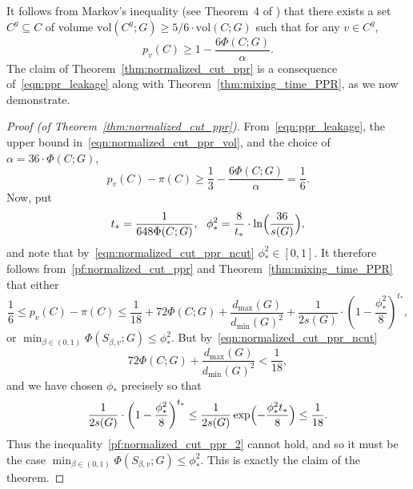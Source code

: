 \documentclass{article}
\newcommand{\vol}{\mathrm{vol}}
\newcommand{\1}{\mathbf{1}}
\theoremstyle{definition}
\theoremstyle{remark}
\begin{document}
It follows from Markov's inequality (see Theorem~4 of \cite{andersen2006}) that there exists a set $C^g \subseteq C$ of volume $\vol(C^g;G) \geq 5/6 \cdot \vol(C;G)$ such that for any $v \in C^g$,
\begin{equation}
\label{eqn:ppr_leakage}
p_v(C) \geq 1 - \frac{6\Phi(C;G)}{\alpha}.
\end{equation}
The claim of Theorem~\ref{thm:normalized_cut_ppr} is a consequence of~\eqref{eqn:ppr_leakage} along with Theorem~\ref{thm:mixing_time_PPR}, as we now demonstrate.
\begin{proof}[Proof (of Theorem~\ref{thm:normalized_cut_ppr})]
	From~\eqref{eqn:ppr_leakage}, the upper bound in~\eqref{eqn:normalized_cut_ppr_vol}, and the choice of $\alpha = 36 \cdot \Phi(C;G)$, 
	\begin{equation}
	\label{pf:normalized_cut_ppr}
	p_v(C) - \pi(C) \geq \frac{1}{3} - \frac{6 \Phi(C;G)}{\alpha} = \frac{1}{6}.
	\end{equation}
	Now, put 
	\begin{equation*}
	t_{\ast} = \frac{1}{648 \Phi(C;G)},~~\phi_{\ast}^2 = \frac{8}{t_{\ast}} \cdot \ln\Bigl(\frac{36}{s(G)}\Bigr),
	\end{equation*}
	and note that by~\eqref{eqn:normalized_cut_ppr_ncut} $\phi_{\ast}^2 \in [0,1]$. It therefore follows from~\eqref{pf:normalized_cut_ppr} and Theorem~\ref{thm:mixing_time_PPR} that either
	\begin{equation}
	\label{pf:normalized_cut_ppr_2}
	\frac{1}{6} \leq p_v(C) - \pi(C) \leq \frac{1}{18} + 72 \Phi(C;G) + \frac{d_{\max}(G)}{d_{\min}(G)^2} + \frac{1}{2s(G)} \cdot \left(1 - \frac{\phi_{\ast}^2}{8}\right)^{t_{\ast}},
	\end{equation}
	or $\min_{\beta \in (0,1)} \Phi(S_{\beta,v};G) \leq \phi_{\ast}^2$. But by~\eqref{eqn:normalized_cut_ppr_ncut}
	\begin{equation*}
	72 \Phi(C;G) + \frac{d_{\max}(G)}{d_{\min}(G)^2} < \frac{1}{18},
	\end{equation*}
	and we have chosen $\phi_{\ast}$ precisely so that
	\begin{equation*}
	\frac{1}{2s(G)} \cdot \left(1 - \frac{\phi_{\ast}^2}{8}\right)^{t_{\ast}} \leq \frac{1}{2s(G)} \exp\Bigl(-\frac{\phi_{\ast}^2 t_{\ast}}{8}\Bigr) \leq \frac{1}{18}.
	\end{equation*}
	Thus the inequality~\eqref{pf:normalized_cut_ppr_2} cannot hold, and so it must be the case $\min_{\beta \in (0,1)} \Phi(S_{\beta,v};G) \leq \phi_{\ast}^2$. This is exactly the claim of the theorem.
\end{proof}
\end{document}

